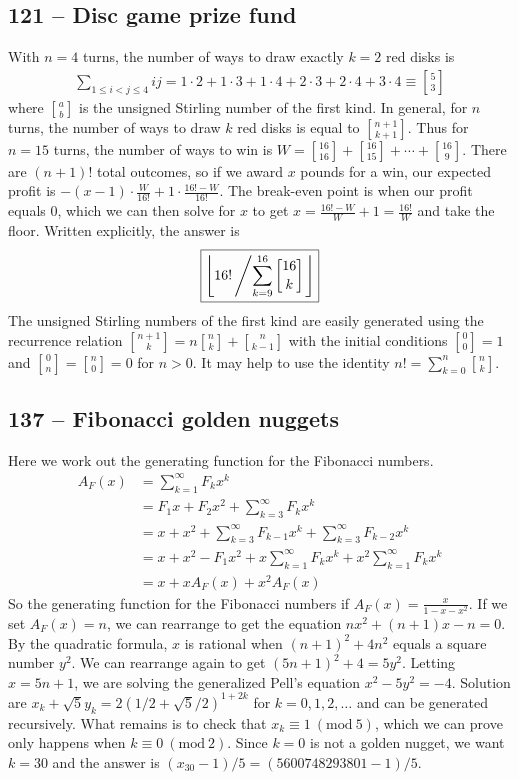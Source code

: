 \documentclass{article}
\newcommand{\stirling}[2]{\genfrac{[}{]}{0pt}{}{#1}{#2}}
\newcommand{\Mod}[1]{\ (\mathrm{mod}\ #1)}
\begin{document}
\subsection*{121 -- Disc game prize fund}
With $n=4$ turns, the number of ways to draw exactly $k=2$ red disks is
\begin{align*}
	\sum_{1 \leq i < j \leq 4} i j = 1\cdot2 + 1\cdot3 + 1\cdot4 + 2\cdot3 + 2\cdot4 + 3\cdot4 \equiv \stirling{5}{3}
\end{align*}
where $\stirling{a}{b}$ is the unsigned Stirling number of the first kind.
In general, for $n$ turns, the number of ways to draw $k$ red disks is equal to $\stirling{n+1}{k+1}$.
Thus for $n = 15$ turns, the number of ways to win is $W = \stirling{16}{16} + \stirling{16}{15} + \cdots + \stirling{16}{9}$.
There are $(n+1)!$ total outcomes, so if we award $x$ pounds for a win, our expected profit is $-(x-1)\cdot\frac{W}{16!} + 1\cdot\frac{16!-W}{16!}$.
The break-even point is when our profit equals 0, which we can then solve for $x$ to get $x = \frac{16!-W}{W}+1 = \frac{16!}{W}$ and take the floor.
Written explicitly, the answer is
\begin{align*}
	\boxed{ \left\lfloor16! \left/ \sum_{k=9}^{16} \stirling{16}{k} \right. \right\rfloor}
\end{align*}
The unsigned Stirling numbers of the first kind are easily generated using the recurrence relation $\stirling{n+1}{k} = n\stirling{n}{k} + \stirling{n}{k-1}$ with the initial conditions $\stirling{0}{0} = 1$ and $\stirling{0}{n} = \stirling{n}{0} = 0$ for $n > 0$.
It may help to use the identity $n! = \sum_{k=0}^n \stirling{n}{k}$.


\subsection*{137 -- Fibonacci golden nuggets}
Here we work out the generating function for the Fibonacci numbers.
\begin{align*}
A_F(x) &= \sum\limits_{k=1}^\infty F_k x^k \\
&= F_1x + F_2x^2 + \sum\limits_{k=3}^\infty F_k x^k \\
&= x + x^2 + \sum\limits_{k=3}^\infty F_{k-1} x^k +  \sum\limits_{k=3}^\infty F_{k-2} x^k \\
&= x + x^2  - F_1x^2 + x\sum\limits_{k=1}^\infty F_k x^k +  x^2\sum\limits_{k=1}^\infty F_k x^k \\
&=  x + xA_F(x) + x^2A_F(x)
\end{align*}
So the generating function for the Fibonacci numbers if $A_F(x) = \frac{x}{1-x-x^2}$.
If we set $A_F(x) = n$, we can rearrange to get the equation $nx^2 + (n+1)x - n = 0$.
By the quadratic formula, $x$ is rational when $(n+1)^2 + 4n^2$ equals a square number $y^2$.
We can rearrange again to get $(5n+1)^2 + 4 = 5y^2$.
Letting $x=5n+1$, we are solving the generalized Pell's equation $x^2 - 5y^2  = -4$.
Solution are $x_k + \sqrt{5}y_k = 2(1/2 + \sqrt{5}/2)^{1 + 2k}$ for $k = 0, 1, 2, \dotsc$ and can be generated recursively.
What remains is to check that $x_k \equiv 1 \Mod{5}$, which we can prove only happens when $k \equiv 0 \Mod 2$.
Since $k=0$ is not a golden nugget, we want $k=30$ and the answer is $(x_{30} - 1)/5 = \boxed{(5600748293801 - 1)/5}$.
\end{document}
